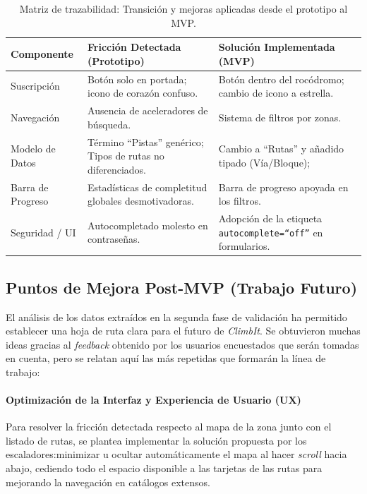 \begin{table}[htbp]
\centering
\small
\begin{tabular}{lp{6cm}p{6cm}}
\hline
\textbf{Componente} & \textbf{Fricción Detectada (Prototipo)} & \textbf{Solución Implementada (MVP)} \\ \hline
Suscripción & Botón solo en portada; icono de corazón confuso. & Botón dentro del rocódromo; cambio de icono a estrella. \\ \hline
Navegación & Ausencia de aceleradores de búsqueda. & Sistema de filtros por zonas. \\ \hline
Modelo de Datos & Término ``Pistas'' genérico; Tipos de rutas no diferenciados. & Cambio a ``Rutas'' y añadido tipado (Vía/Bloque); \\ \hline
Barra de Progreso & Estadísticas de completitud globales desmotivadoras. & Barra de progreso apoyada en los filtros. \\ \hline
Seguridad / UI & Autocompletado molesto en contraseñas. & Adopción de la etiqueta \texttt{autocomplete=``off''} en formularios. \\ \hline
\end{tabular}
\caption{Matriz de trazabilidad: Transición y mejoras aplicadas desde el prototipo al MVP.}
\label{tab:trazabilidadMVP}
\end{table}
    
\subsection{Puntos de Mejora Post-MVP (Trabajo Futuro)}
\label{subsec:mejorasPostMVP}

El análisis de los datos extraídos en la segunda fase de validación ha permitido establecer una hoja de ruta clara para el futuro de \textit{ClimbIt}. Se obtuvieron muchas ideas gracias al \textit{feedback} obtenido por los usuarios encuestados que serán tomadas en cuenta, pero se relatan aquí las más repetidas que formarán la línea de trabajo:

\paragraph{Optimización de la Interfaz y Experiencia de Usuario (UX)}
Para resolver la fricción detectada respecto al mapa de la zona junto con el listado de rutas, se plantea implementar la solución propuesta por los escaladores:minimizar u ocultar automáticamente el mapa al hacer \textit{scroll} hacia abajo, cediendo todo el espacio disponible a las tarjetas de las rutas para mejorando la navegación en catálogos extensos.

